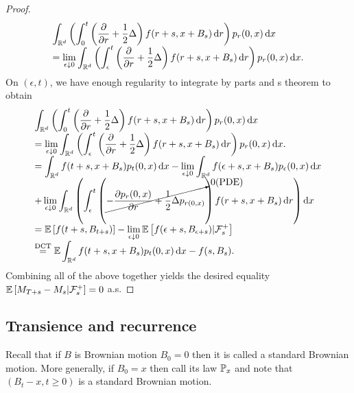 \documentclass{article}
\begin{document}
\begin{proof}
\[\begin{array}{ll}
          \displaystyle\int_{\mathbb{R}^{d}}\left( \displaystyle\int^{t}_{0} \left( \frac{\partial}{\partial r}+\frac{1}{2}\Delta \right) f(r+s, x+B_{s})\operatorname{d}\! r \right) p_{r}(0,x)\operatorname{d}\! x \\ 
	  = \displaystyle\lim_{\epsilon \downarrow 0}  \displaystyle\int_{\mathbb{R}^{d}}\left( \displaystyle\int^{t}_{\epsilon} \left( \frac{\partial}{\partial r}+\frac{1}{2}\Delta \right) f(r+s, x+B_{s})\operatorname{d}\! r \right) p_{r}(0,x)\operatorname{d}\! x.
    \end{array}
    \]
   On $ (\epsilon, t)$, we have enough regularity to integrate by parts and s theorem to obtain 
   \[
   \begin{array}{ll}
        \displaystyle\int_{\R^{d}}\left( \displaystyle\int^{t}_{0} \left( \frac{\partial}{\partial r}+\frac{1}{2}\Delta \right) f(r+s, x+B_{s})\diff r \right) p_{r}(0,x)\diff x \\
        = \displaystyle\lim_{\epsilon \downarrow 0}  \displaystyle\int_{\R^{d}}\left( \displaystyle\int^{t}_{\epsilon} \left( \frac{\partial}{\partial r}+\frac{1}{2}\Delta \right) f(r+s, x+B_{s})\diff r \right) p_{r}(0,x)\diff x.\\ 
	= \displaystyle\int_{\R^{d}}f(t+s, x+B_{s}) p_{t}(0,x)\diff x - \displaystyle\lim_{\epsilon\downarrow 0}\displaystyle\int_{\R^{d}}f(\epsilon+s, x+B_{s}) p_{\epsilon}(0,x)\diff x \\ 
	+  \displaystyle\lim_{\epsilon \downarrow 0}  \displaystyle\int_{\R^{d}}\left( \displaystyle\int^{t}_{\epsilon} \left(\cancelto{0 (\text{PDE})}{-\frac{\partial p_{r}(0,x)}{\partial r}+\frac{1}{2}\Delta p_{r(0,x)} }\right) f(r+s, x+B_{s})\diff r \right) \diff x\\ 
	= \mathbb{E}\left[ f(t+s, B_{t+s}) \right]
- \displaystyle\lim_{\epsilon\downarrow 0}\mathbb{E}\left[ f(\epsilon+s, B_{\epsilon+s})|\F^{+}_{s} \right]\\ 
\stackrel{\text{DCT}}{=}\mathbb{E}\displaystyle\int_{\R^{d}}f(t+s, x+B_{s}) p_{t}(0,x)\diff x
-  f(s, B_{s}).
   \end{array}
   \]
   Combining all of the above together yields the desired equality $ \mathbb{E}\left[ M_{T+s}-M_{s} | \mathcal{F}^{+}_{s} \right]=0$ a.s.
\end{proof}

\subsection{Transience and recurrence}\label{sec: transience and recurrence}
Recall that if $ B$ is  Brownian motion $ B_{0}=0$ then it is called a standard Brownian motion. More generally, if $ B_{0} =x$ then call its law $ \mathbb{P}_{x}$ and note that $ (B_{t}-x, t\geq 0)$ is a standard Brownian motion.\\ 
\end{document}
